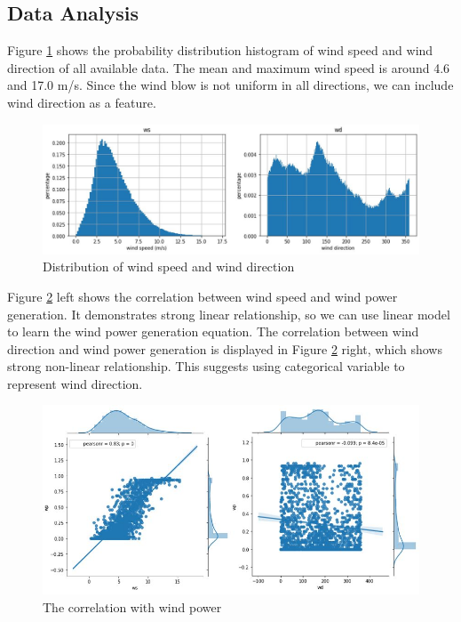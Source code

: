 \documentclass[conference]{IEEEtran}
\begin{document}
\subsection{Data Analysis}
Figure \ref{fig:hist} shows the probability distribution histogram of wind speed and wind direction of all available data. The mean and maximum wind speed is around 4.6 and 17.0 m/s. Since the wind blow is not uniform in all directions, we can include wind direction as a feature. 
\begin{figure}
\centering
\includegraphics[width=0.9\columnwidth]{FIG/hist}
\caption{Distribution of wind speed and wind direction}
\label{fig:hist}
\end{figure}

Figure \ref{fig:pearson} left shows the correlation between wind speed and wind power generation. It demonstrates strong linear relationship, so we can use linear model to learn the wind power generation equation. The correlation between wind direction and wind power generation is displayed in Figure \ref{fig:pearson} right, which shows strong non-linear relationship. This suggests using categorical variable to represent wind direction. 
\begin{figure}
\centering
\includegraphics[width=0.9\columnwidth]{FIG/pearson}
\caption{The correlation with wind power}
\label{fig:pearson}
\end{figure}
\end{document}
